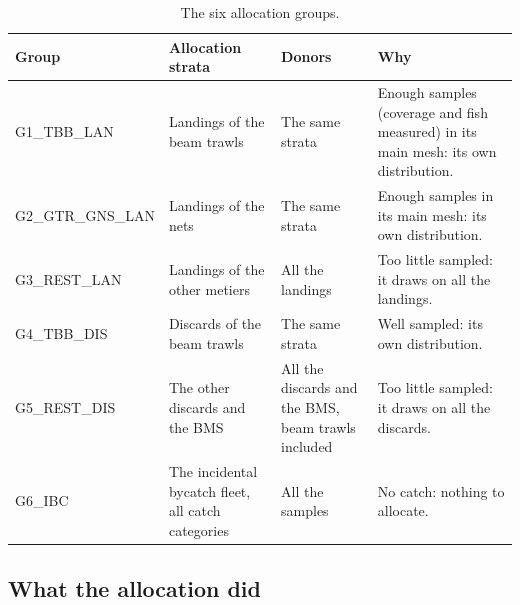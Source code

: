 \documentclass[
  a4paper,
  DIV=11,
  numbers=noendperiod]{scrartcl}
\begin{document}
\begin{longtable}[]{@{}
  >{\raggedright\arraybackslash}p{}
  >{\raggedright\arraybackslash}p{}
  >{\raggedright\arraybackslash}p{}
  >{\raggedright\arraybackslash}p{}@{}}

\caption{\label{tbl-groups-alloc}The six allocation groups.}

\tabularnewline

\toprule\noalign{}
\begin{minipage}[b]{\linewidth}\raggedright
Group
\end{minipage} & \begin{minipage}[b]{\linewidth}\raggedright
Allocation strata
\end{minipage} & \begin{minipage}[b]{\linewidth}\raggedright
Donors
\end{minipage} & \begin{minipage}[b]{\linewidth}\raggedright
Why
\end{minipage} \\
\midrule\noalign{}
\endhead
\bottomrule\noalign{}
\endlastfoot
G1\_TBB\_LAN & Landings of the beam trawls & The same strata & Enough
samples (coverage and fish measured) in its main mesh: its own
distribution. \\
G2\_GTR\_GNS\_LAN & Landings of the nets & The same strata & Enough
samples in its main mesh: its own distribution. \\
G3\_REST\_LAN & Landings of the other metiers & All the landings & Too
little sampled: it draws on all the landings. \\
G4\_TBB\_DIS & Discards of the beam trawls & The same strata & Well
sampled: its own distribution. \\
G5\_REST\_DIS & The other discards and the BMS & All the discards and
the BMS, beam trawls included & Too little sampled: it draws on all the
discards. \\
G6\_IBC & The incidental bycatch fleet, all catch categories & All the
samples & No catch: nothing to allocate. \\

\end{longtable}

\subsection{What the allocation did}\label{what-the-allocation-did}
\end{document}
